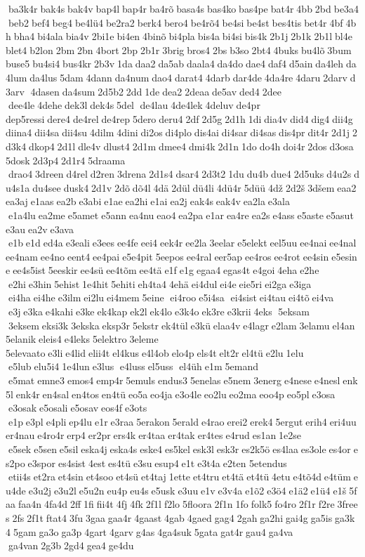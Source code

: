  ba3k4r bak4s bak4v bap4l bap4r ba4rõ basa4s bas4ko bas4pe bat4r 4bb 2bd be3a4 beb2 bef4 beg4 be4lü4 be2ra2 berk4 bero4 be4rõ4 be4si be4st bes4tis bet4r 4bf 4bh bha4 bi4ala bia4v 2bi1e bi4en 4binõ bi4pla bis4a bi4si bis4k 2b1j 2b1k 2b1l bl4e blet4 b2lon 2bm 2bn 4bort 2bp 2b1r 3brig bros4 2bs b3so 2bt4 4buks bu4lõ 3bum buse5 bu4si4 bus4kr 2b3v 1da daa2 da5ab daala4 da4do dae4 daf4 d5ain da4leh da4lum da4lus 5dam 4dann da4num dao4 darat4 4darb dar4de 4da4re 4daru 2darv d3arv  4dasen da4sum 2d5b2 2dd 1de dea2 2deaa de5av ded4 2dee  dee4le 4dehe dek3l dek4s 5del  de4lau 4de4lek 4deluv de4pr 	dep5ressi dere4 de4rel de4rep 5dero deru4 2df 2d5g 2d1h 1di dia4v did4 dig4 dii4g diina4 dii4sa dii4su 4dilm 4dini di2os di4plo dis4ai di4sar di4sas dis4pr dit4r 2d1j 2d3k4 dkop4 2d1l dle4v dlust4 2d1m dmee4 dmi4k 2d1n 1do do4h doi4r 2dos d3osa 5dosk 2d3p4 2d1r4 5draama  drao4 3dreen d4rel d2ren 3drena 2d1s4 dsar4 2d3t2 1du du4b due4 2d5uks d4u2s du4s1a du4see dusk4 2d1v 2dõ dõ4l 4dä 2dül dü4li 4dü4r 5düü 4dž 2d2š 3dšem eaa2 ea3aj e1aas ea2b e3abi e1ae ea2hi e1ai ea2j eak4s eak4v ea2la e3ala  e1a4lu ea2me e5amet e5ann ea4nu eao4 ea2pa e1ar ea4re ea2s e4ass e5aste e5asut e3au ea2v e3ava  e1b e1d ed4a e3eali e3ees ee4fe eei4 eek4r ee2la 3eelar e5elekt eel5uu ee4nai ee4nal ee4nam ee4no eent4 ee4pai e5e4pit 5eepos ee4ral eer5ap ee4ros ee4rot ee4sin e5esine ee4s5ist 5eeskir ee4sü ee4tõm ee4tä e1f e1g egaa4 egas4t e4goi 4eha e2he  e2hi e3hin 5ehist 1e4hit 5ehiti eh4ta4 4ehä ei4dul ei4e eie5ri ei2ga e3iga  ei4ha ei4he e3ilm ei2lu ei4mem 5eine  ei4roo e5i4sa  ei4sist ei4tau ei4tõ ei4va  e3j e3ka e4kahi e3ke ek4kap ek2l ek4lo e3k4o ek3re e3krii 4eks  5eksam  3eksem eksi3k 3ekska eksp3r 5ekstr ek4tül e3kü elaa4v e4lagr e2lam 3elamu el4an 5elanik eleis4 e4leks 5elektro 3eleme 	5elevaato e3li e4lid elii4t el4kus e4l4ob elo4p els4t elt2r el4tü e2lu 1elu  e5lub elu5i4 1e4lun e3lus  e4luss el5uss  el4üh e1m 5emand  e5mat emne3 emos4 emp4r 5emuls endus3 5enelas e5nem 3energ e4nese e4nesl enk5l enk4r en4sal en4tos en4tü eo5a eo4ja e3o4le eo2lu eo2ma eoo4p eo5pl e3osa  e3osak e5osali e5osav eos4f e3ots  e1p e3pl e4pli ep4lu e1r e3raa 5erakon 5erald e4rao erei2 erek4 5ergut erih4 eri4uu er4nau e4ro4r erp4 er2pr ers4k er4taa er4tak er4tes e4rud es1an 1e2se  e5sek e5sen e5sil eska4j eska4s eske4 es5kel esk3l esk3r es2k5ö es4laa es3ole es4or es2po e3spor es4sist 4est es4tü e3su esup4 e1t e3t4a e2ten 	5etendus  etii4s et2ra et4sin et4soo et4sü et4taj 1ette et4tru et4tä et4tü 4etu e4tõ4d e4tüm eu4de e3u2j e3u2l e5u2n eu4p eu4s e5usk e3uu e1v e3v4a e1õ2 e3ö4 e1ä2 e1ü4 e1š 5faa faa4n 4fa4d 2ff 1fi fii4t 4fj 4fk 2f1l f2lo 5floora 2f1n 1fo folk5 fo4ro 2f1r f2re 3frees 2fs 2f1t ftat4 3fu 3gaa gaa4r 4gaast 4gab 4gaed gag4 2gah ga2hi gai4g ga5is ga3k4 5gam ga3o ga3p 4gart 4garv g4as 4ga4suk 5gata gat4r gau4 ga4va  ga4van 2g3b 2gd4 gea4 ge4du 